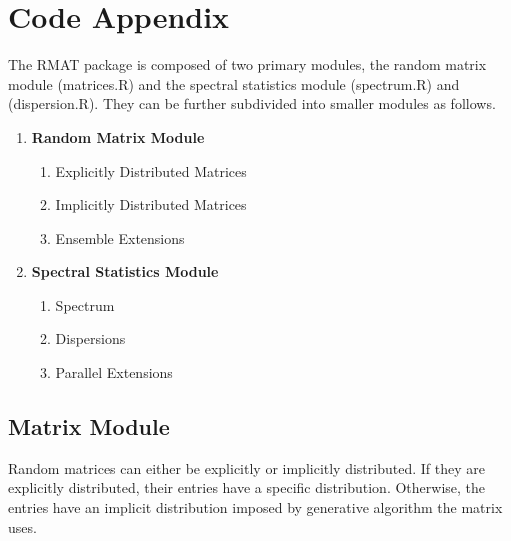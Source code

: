 
\chapter{Code Appendix}


\noindent
The RMAT package is composed of two primary modules, the random matrix module (matrices.R) and the spectral statistics module (spectrum.R) and (dispersion.R). They can be further subdivided into smaller modules as follows.

\begin{enumerate}
  \item \textbf{Random Matrix Module}
    \begin{enumerate}
      \item Explicitly Distributed Matrices
      \item Implicitly Distributed Matrices
      \item Ensemble Extensions
    \end{enumerate}

  \item \textbf{Spectral Statistics Module}
    \begin{enumerate}
      \item Spectrum
      \item Dispersions
      \item Parallel Extensions
    \end{enumerate}
\end{enumerate}

\newpage
\section{Matrix Module}

Random matrices can either be explicitly or implicitly distributed. If they are explicitly distributed, their entries have a specific distribution. Otherwise, the entries have an implicit distribution imposed by generative algorithm the matrix uses.

